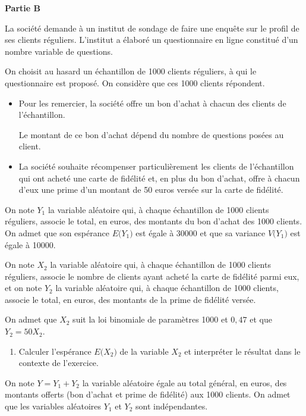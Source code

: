 \begin{Centrage}
	\textbf{Partie B}
\end{Centrage}

La société demande à un institut de sondage de faire une enquête sur le profil de ses clients réguliers. L'institut a élaboré un questionnaire en ligne constitué d'un nombre variable de questions.

On choisit au hasard un échantillon de \num{1000} clients réguliers, à qui le questionnaire est proposé. On considère que ces \num{1000} clients répondent.

\begin{itemize}
	\item Pour les remercier, la société offre un bon d'achat à chacun des clients de l'échantillon.
	
	Le montant de ce bon d'achat dépend du nombre de questions posées au client.
	\item La société souhaite récompenser particulièrement les clients de l'échantillon qui ont acheté une carte de fidélité et, en plus du bon d'achat, offre à chacun d'eux une prime d'un montant de 50 euros versée sur la carte de fidélité.
\end{itemize}

On note $Y_1$ la variable aléatoire qui, à chaque échantillon de \num{1000} clients réguliers, associe le total, en euros, des montants du bon d'achat des \num{1000} clients. On admet que son espérance $E\big(Y_1\big)$ est égale à \num{30000} et que sa variance $V\big(Y_1\big)$ est égale à \num{10000}.

\smallskip

On note $X_2$ la variable aléatoire qui, à chaque échantillon de \num{1000} clients réguliers, associe le nombre de clients ayant acheté la carte de fidélité parmi eux, et on note $Y_2$ la variable aléatoire qui, à chaque échantillon de \num{1000} clients, associe le total, en euros, des montants de la prime de fidélité versée.

On admet que $X_2$ suit la loi binomiale de paramètres \num{1000} et $0,47$ et que $Y_2 = 50X_2$.

\begin{enumerate}
	\item Calculer l'espérance $E\big(X_2\big)$ de la variable $X_2$ et interpréter le résultat dans le contexte de l'exercice.
\end{enumerate}

On note $Y=Y_1+Y_2$ la variable aléatoire égale au total général, en euros, des montants offerts (bon d'achat et prime de fidélité) aux \num{1000} clients. On admet que les variables aléatoires $Y_1$ et $Y_2$ sont indépendantes.

